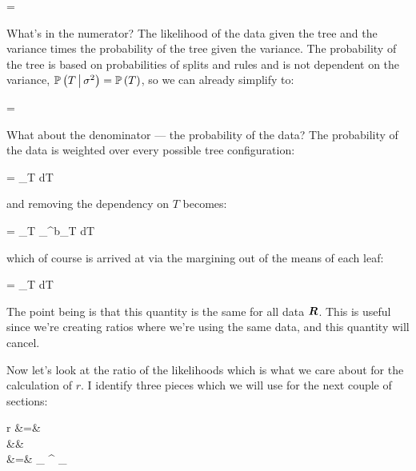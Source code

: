 \beqn
{} = 
\eeqn

What's in the numerator? The likelihood of the data given the tree and the variance times the probability of the tree given the variance. The probability of the tree is based on probabilities of splits and rules and is not dependent on the variance, $\mathbb{P}\left(T \, \big| \, \sigma^2\right) = \mathbb{P}\left(T\right)$, so we can already simplify to:

\beqn
{} = 
\eeqn

What about the denominator --- the probability of the data? The probability of the data is weighted over every possible tree configuration:

\beqn
\cprob{\R}{\sigsq} = \int_{T \in {}}   dT
\eeqn

and removing the dependency on $T$ becomes:

\beqn
\cprob{\R}{\sigsq} = \int_{T \in {}} \prod_{}^{b_T} \cprob{\Rlonetonl}{\sigsq}  dT
\eeqn

which of course is arrived at via the margining out of the means of each leaf:

\beqn
\cprob{\R}{\sigsq} = \int_{T \in {}}   dT
\eeqn

The point being is that this quantity is the same for all data $\boldsymbol{R}$. This is useful since we're creating ratios where we're using the same data, and this quantity will cancel.

Now let's look at the ratio of the likelihoods which is what we care about for the calculation of $r$. I identify three pieces which we will use for the next couple of sections:

\beqn
r &=&   \\
&& \quad\quad\quad\quad~~  \\
&=& _{} \times {}^{} \times {}_{}
\eeqn

